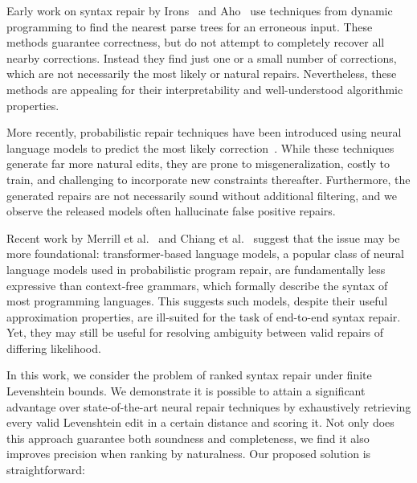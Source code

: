 \documentclass[sigplan,review,acmsmall,nonacm,anonymous]{acmart}\settopmatter{printfolios=false,printccs=false,printacmref=false}
\begin{document}
  Early work on syntax repair by Irons~\cite{irons1963error} and Aho~\cite{aho1972minimum} use techniques from dynamic programming to find the nearest parse trees for an erroneous input. These methods guarantee correctness, but do not attempt to completely recover all nearby corrections. Instead they find just one or a small number of corrections, which are not necessarily the most likely or natural repairs. Nevertheless, these methods are appealing for their interpretability and well-understood algorithmic properties.

  More recently, probabilistic repair techniques have been introduced using neural language models to predict the most likely correction~\cite{allamanis2021self, yasunaga2021break, sakkas2022seq2parse}. While these techniques generate far more natural edits, they are prone to misgeneralization, costly to train, and challenging to incorporate new constraints thereafter. Furthermore, the generated repairs are not necessarily sound without additional filtering, and we observe the released models often hallucinate false positive repairs.

  Recent work by Merrill et al.~\cite{merrill2022saturated} and Chiang et al.~\cite{chiang2023tighter} suggest that the issue may be more foundational: transformer-based language models, a popular class of neural language models used in probabilistic program repair, are fundamentally less expressive than context-free grammars, which formally describe the syntax of most programming languages. This suggests such models, despite their useful approximation properties, are ill-suited for the task of end-to-end syntax repair. Yet, they may still be useful for resolving ambiguity between valid repairs of differing likelihood.

  In this work, we consider the problem of ranked syntax repair under finite Levenshtein bounds. We demonstrate it is possible to attain a significant advantage over state-of-the-art neural repair techniques by exhaustively retrieving every valid Levenshtein edit in a certain distance and scoring it. Not only does this approach guarantee both soundness and completeness, we find it also improves precision when ranking by naturalness. Our proposed solution is straightforward:
\end{document}
